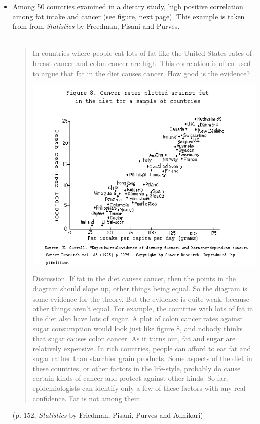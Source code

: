 \begin{itemize}
\item Among 50 countries examined in a dietary study, high positive correlation among fat intake and cancer (see figure, next page).  This example is taken from from {\em Statistics} by Freedman, Pisani and Purves.\\~\\
\begin{quotation} 
In countries where people eat lots of fat like the United States rates of breast cancer and colon cancer are high. This correlation is often used to argue that fat in the diet causes cancer. How good is the evidence?
\begin{center}
\includegraphics[scale=0.5]{scattercancer}
\end{center}
Discussion. If fat in the diet causes cancer, then the points in the diagram should slope up, other things being equal. So the diagram is some evidence for the theory. But the evidence is quite weak, because other things aren't equal. For example, the countries with lots of fat in the diet also have lots of sugar. A plot of colon cancer rates against sugar consumption would look just like figure 8, and nobody thinks that sugar causes colon cancer. As it turns out, fat and sugar are relatively expensive. In rich countries, people can afford to eat fat
and sugar rather than starchier grain products. Some aspects of the diet in these countries, or other factors in the life-style, probably do cause certain kinds of cancer and protect against other kinds. So far, epidemiologists can identify only a few of these factors with any real confidence. Fat is not among them. 
\end{quotation} 
(p. 152, {\em Statistics} by Friedman, Pisani, Purves and Adhikari)
\end{itemize}




